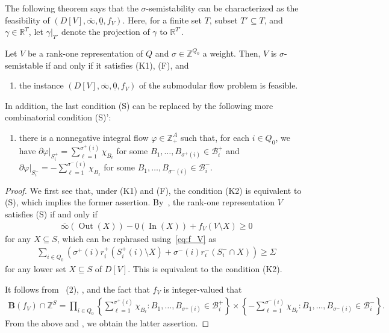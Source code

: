 \documentclass[a4paper,11pt]{article}
\numberwithin{equation}{section}
\newcommand{\R}{\mathbb{R}}
\newcommand{\Z}{\mathbb{Z}}
\newcommand{\BB}{\mathbf{B}}
\DeclareMathOperator{\In}{In}
\DeclareMathOperator{\Out}{Out}
\begin{document}
The following theorem says that the $\sigma$-semistability can be characterized as the feasibility of $(D[V], \overline{\infty}, \underline{0}, f_V)$.
Here, for a finite set $T$, subset $T' \subseteq T$, and $\gamma \in \R^T$,
let $\gamma|_{T'}$ denote the projection of $\gamma$ to $\R^{T'}$.
\begin{theorem}\label{thm:submodular-flow}
Let $V$ be a rank-one representation of $Q$ and $\sigma \in \Z^{Q_0}$ a weight.
Then, $V$ is $\sigma$-semistable if and only if it satisfies {\rm (K1)}, {\rm (F)}, and
\begin{enumerate}[{label={\upshape{(S)}}}]
    \item the instance $(D[V], \overline{\infty}, \underline{0}, f_V)$ of the submodular flow problem is feasible.
\end{enumerate}
In addition, the last condition {\rm (S)} can be replaced by the following more combinatorial condition {\rm (S)'}:
\begin{enumerate}[{label={\upshape{(S)'}}}]
    \item there is a nonnegative integral flow $\varphi \in \Z_+^A$ such that, for each $i \in Q_0$, we have
    $\partial \varphi|_{S_i^+} = \sum_{\ell = 1}^{\sigma^+(i)} \chi_{B_\ell}$ for some $B_1, \dots, B_{\sigma^+(i)} \in \mathcal{B}_i^+$ and $\partial \varphi|_{S_i^-} = - \sum_{\ell = 1}^{\sigma^-(i)} \chi_{B_\ell}$ for some $B_1, \dots, B_{\sigma^-(i)} \in \mathcal{B}_i^-$.
\end{enumerate}
\end{theorem}
\begin{proof}
    We first see that, under (K1) and (F),
    the condition (K2) is equivalent to (S), which implies the former assertion.
    By~,
    the rank-one representation $V$ satisfies (S)
    if and only if
    \begin{align}
        \overline{\infty}(\Out(X)) - \underline{0}(\In(X)) + f_V(V \setminus X) \geq 0
    \end{align}
    for any $X \subseteq S$,
    which can be rephrased using~\eqref{eq:f_V} as
    \begin{align}
        \sum_{i \in Q_0} \left( \sigma^+(i) r_i^+(S_i^+(i) \setminus X) + \sigma^-(i) r_i^-(S_i^- \cap X)\right) \geq \Sigma
    \end{align}
    for any lower set $X \subseteq S$ of $D[V]$.
    This is equivalent to the condition (K2).

    
    It follows from ~(2), ,
    and the fact that $f_V$ is integer-valued that
    \begin{align}
        \BB(f_V) \cap \Z^S = \prod_{i \in Q_0} \left\{ \sum_{\ell = 1}^{\sigma^+(i)} \chi_{B_\ell} : B_1, \dots, B_{\sigma^+(i)} \in \mathcal{B}_i^+ \right\} \times \left\{ -\sum_{\ell = 1}^{\sigma^-(i)} \chi_{B_\ell} : B_1, \dots, B_{\sigma^-(i)} \in \mathcal{B}_i^- \right\}.
    \end{align}
    From the above and ,
    we obtain the latter assertion.
\end{proof}
\end{document}
